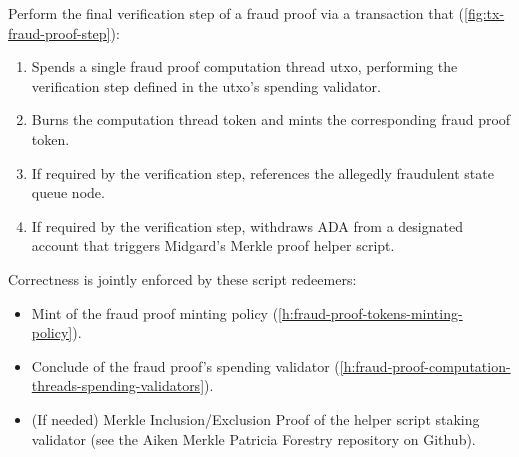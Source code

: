 \documentclass[../midgard.tex]{subfiles}
\begin{document}
Perform the final verification step of a fraud proof via a transaction that (\cref{fig:tx-fraud-proof-step}):
\begin{enumerate}
  \item Spends a single fraud proof computation thread utxo, performing the verification step defined in the utxo's spending validator.
  \item Burns the computation thread token and mints the corresponding fraud proof token.
  \item If required by the verification step, references the allegedly fraudulent state queue node.
  \item If required by the verification step, withdraws ADA from a designated account that triggers Midgard's Merkle proof helper script.
\end{enumerate}

Correctness is jointly enforced by these script redeemers:
\begin{itemize}
  \item Mint of the fraud proof minting policy (\cref{h:fraud-proof-tokens-minting-policy}).
  \item Conclude of the fraud proof's spending validator (\cref{h:fraud-proof-computation-threads-spending-validators}).
  \item (If needed) Merkle Inclusion/Exclusion Proof of the helper script staking validator (see the Aiken Merkle Patricia Forestry repository on Github).
\end{itemize}
\end{document}
